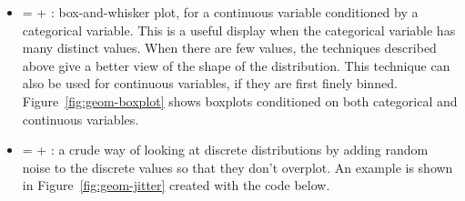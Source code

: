 \begin{itemize}
  \item {} =  + : box-and-whisker plot, for a continuous variable conditioned by a categorical variable.  This is a useful display when the categorical variable has many distinct values.  When there are few values, the techniques described above give a better view of the shape of the distribution.  This technique can also be used for continuous variables, if they are first finely binned.   Figure~\ref{fig:geom-boxplot} shows boxplots conditioned on both categorical and continuous variables.
  
    
  
  \item {} =  + : a crude way of looking at discrete distributions by adding random noise to the discrete values so that they don't overplot.  An example is shown in Figure~\ref{fig:geom-jitter} created with the code below.
  
    
  


\end{itemize}
